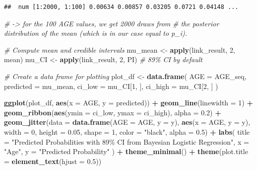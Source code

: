 \documentclass[
]{article}
\newenvironment{Shaded}{\begin{snugshade}}{\end{snugshade}}
\newcommand{\AttributeTok}[1]{\textcolor[rgb]{0.13,0.29,0.53}{#1}}
\newcommand{\CommentTok}[1]{\textcolor[rgb]{0.56,0.35,0.01}{\textit{#1}}}
\newcommand{\DecValTok}[1]{\textcolor[rgb]{0.00,0.00,0.81}{#1}}
\newcommand{\FloatTok}[1]{\textcolor[rgb]{0.00,0.00,0.81}{#1}}
\newcommand{\FunctionTok}[1]{\textcolor[rgb]{0.13,0.29,0.53}{\textbf{#1}}}
\newcommand{\NormalTok}[1]{#1}
\newcommand{\OtherTok}[1]{\textcolor[rgb]{0.56,0.35,0.01}{#1}}
\newcommand{\SpecialCharTok}[1]{\textcolor[rgb]{0.81,0.36,0.00}{\textbf{#1}}}
\newcommand{\StringTok}[1]{\textcolor[rgb]{0.31,0.60,0.02}{#1}}
\begin{document}
\begin{verbatim}
##  num [1:2000, 1:100] 0.00634 0.00857 0.03205 0.0721 0.04148 ...
\end{verbatim}

\begin{Shaded}
\begin{Highlighting}[]
\CommentTok{\# {-}\textgreater{} for the 100 AGE values, we get 2000 draws from}
\CommentTok{\# the posterior distribution of the mean (which is in our case equal to p\_i).}

\CommentTok{\# Compute mean and credible intervals}
\NormalTok{mu\_mean }\OtherTok{\textless{}{-}} \FunctionTok{apply}\NormalTok{(link\_result, }\DecValTok{2}\NormalTok{, mean)}
\NormalTok{mu\_CI }\OtherTok{\textless{}{-}} \FunctionTok{apply}\NormalTok{(link\_result, }\DecValTok{2}\NormalTok{, PI)  }\CommentTok{\# 89\% CI by default}

\CommentTok{\# Create a data frame for plotting}
\NormalTok{plot\_df }\OtherTok{\textless{}{-}} \FunctionTok{data.frame}\NormalTok{(}
  \AttributeTok{AGE =}\NormalTok{ AGE\_seq,}
  \AttributeTok{predicted =}\NormalTok{ mu\_mean,}
  \AttributeTok{ci\_low =}\NormalTok{ mu\_CI[}\DecValTok{1}\NormalTok{, ],}
  \AttributeTok{ci\_high =}\NormalTok{ mu\_CI[}\DecValTok{2}\NormalTok{, ]}
\NormalTok{)}

\FunctionTok{ggplot}\NormalTok{(plot\_df, }\FunctionTok{aes}\NormalTok{(}\AttributeTok{x =}\NormalTok{ AGE, }\AttributeTok{y =}\NormalTok{ predicted)) }\SpecialCharTok{+}
  \FunctionTok{geom\_line}\NormalTok{(}\AttributeTok{linewidth =} \DecValTok{1}\NormalTok{) }\SpecialCharTok{+}
  \FunctionTok{geom\_ribbon}\NormalTok{(}\FunctionTok{aes}\NormalTok{(}\AttributeTok{ymin =}\NormalTok{ ci\_low, }\AttributeTok{ymax =}\NormalTok{ ci\_high), }\AttributeTok{alpha =} \FloatTok{0.2}\NormalTok{) }\SpecialCharTok{+}
  \FunctionTok{geom\_jitter}\NormalTok{(}\AttributeTok{data =} \FunctionTok{data.frame}\NormalTok{(}\AttributeTok{AGE =}\NormalTok{ AGE, }\AttributeTok{y =}\NormalTok{ y),}
              \FunctionTok{aes}\NormalTok{(}\AttributeTok{x =}\NormalTok{ AGE, }\AttributeTok{y =}\NormalTok{ y),}
              \AttributeTok{width =} \DecValTok{0}\NormalTok{, }\AttributeTok{height =} \FloatTok{0.05}\NormalTok{,}
              \AttributeTok{shape =} \DecValTok{1}\NormalTok{, }\AttributeTok{color =} \StringTok{"black"}\NormalTok{, }\AttributeTok{alpha =} \FloatTok{0.5}\NormalTok{) }\SpecialCharTok{+}
  \FunctionTok{labs}\NormalTok{(}
    \AttributeTok{title =} \StringTok{"Predicted Probabilities with 89\% CI from Bayesian Logistic Regression"}\NormalTok{,}
    \AttributeTok{x =} \StringTok{"Age"}\NormalTok{,}
    \AttributeTok{y =} \StringTok{"Predicted Probability"}
\NormalTok{  ) }\SpecialCharTok{+}
  \FunctionTok{theme\_minimal}\NormalTok{() }\SpecialCharTok{+}
  \FunctionTok{theme}\NormalTok{(}\AttributeTok{plot.title =} \FunctionTok{element\_text}\NormalTok{(}\AttributeTok{hjust =} \FloatTok{0.5}\NormalTok{))}
\end{Highlighting}
\end{Shaded}
\end{document}
